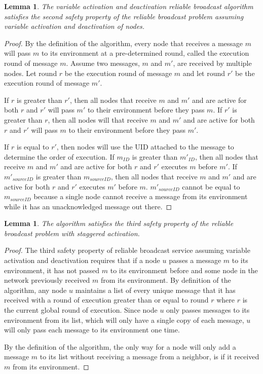 \documentclass[english]{article}
\newtheorem{lemma}[theorem]{Lemma}
\begin{document}
\begin{lemma}
\label{DeactivationRBSafety2}
The variable activation and deactivation reliable broadcast algorithm satisfies the second safety property of the reliable broadcast problem assuming variable activation and deactivation of nodes.
\end{lemma}
\begin{proof}

By the definition of the algorithm, every node that receives a message $m$ will pass $m$ to its environment at a pre-determined round, called the execution round of message $m$. Assume two messages, $m$ and $m'$, are received by multiple nodes. Let round $r$ be the execution round of message $m$ and let round $r'$ be the execution round of message $m'$.

If $r$ is greater than $r'$, then all nodes that receive $m$ and $m'$ and are active for both $r$ and $r'$ will pass $m'$ to their environment before they pass $m$. If $r'$ is greater than $r$, then all nodes will that receive $m$ and $m'$ and are active for both $r$ and $r'$ will pass $m$ to their environment before they pass $m'$.

If $r$ is equal to $r'$, then nodes will use the UID attached to the message to determine the order of execution. If $m_{ID}$ is greater than $m'_{ID}$, then all nodes that receive $m$ and $m'$ and are active for both $r$ and $r'$ executes $m$ before $m'$. If $m'_{sourceID}$ is greater than $m_{sourceID}$, then all nodes that receive $m$ and $m'$ and are active for both $r$ and $r'$ executes $m'$ before $m$. $m'_{sourceID}$ cannot be equal to $m_{sourceID}$ because a single node cannot receive a message from its environment while it has an unacknowledged message out there.



\end{proof}


\begin{lemma}
\label{DeactivationRBSafety3}
The algorithm satisfies the third safety property of the reliable broadcast problem with staggered activation.
\end{lemma}
\begin{proof}

The third safety property of reliable broadcast service assuming variable activation and deactivation requires that if a node $u$ passes a message $m$ to its environment, it has not passed $m$ to its environment before and some node in the network previously received $m$ from its environment. By definition of the algorithm, any node $u$ maintains a list of every unique message that it has received with a round of execution greater than or equal to round $r$ where $r$ is the current global round of execution. Since node $u$ only passes messages to its environment from its list, which will only have a single copy of each message, $u$ will only pass each message to its environment one time. 

By the definition of the algorithm, the only way for a node will only add a message $m$ to its list without receiving a message from a neighbor, is if it received $m$ from its environment.


\end{proof}
\end{document}
